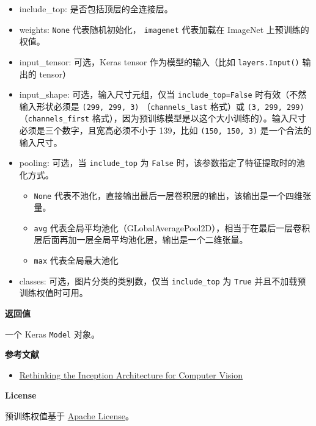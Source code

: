 \begin{itemize}
\tightlist
\item
  include\_top: 是否包括顶层的全连接层。
\item
  weights: \texttt{None} 代表随机初始化，
  \texttt{\textquotesingle{}imagenet\textquotesingle{}} 代表加载在
  ImageNet 上预训练的权值。
\item
  input\_tensor: 可选，Keras tensor 作为模型的输入（比如
  \texttt{layers.Input()} 输出的 tensor）
\item
  input\_shape: 可选，输入尺寸元组，仅当 \texttt{include\_top=False}
  时有效（不然输入形状必须是 \texttt{(299,\ 299,\ 3)}
  （\texttt{channels\_last} 格式）或 \texttt{(3,\ 299,\ 299)}
  （\texttt{channels\_first}
  格式），因为预训练模型是以这个大小训练的）。输入尺寸必须是三个数字，且宽高必须不小于
  139，比如 \texttt{(150,\ 150,\ 3)} 是一个合法的输入尺寸。
\item
  pooling: 可选，当 \texttt{include\_top} 为 \texttt{False}
  时，该参数指定了特征提取时的池化方式。

  \begin{itemize}
  \tightlist
  \item
    \texttt{None}
    代表不池化，直接输出最后一层卷积层的输出，该输出是一个四维张量。
  \item
    \texttt{\textquotesingle{}avg\textquotesingle{}}
    代表全局平均池化（GLobalAveragePool2D），相当于在最后一层卷积层后面再加一层全局平均池化层，输出是一个二维张量。
  \item
    \texttt{\textquotesingle{}max\textquotesingle{}} 代表全局最大池化
  \end{itemize}
\item
  classes: 可选，图片分类的类别数，仅当 \texttt{include\_top} 为
  \texttt{True} 并且不加载预训练权值时可用。
\end{itemize}

\textbf{返回值}\label{ux8fd4ux56deux503c-5}

一个 Keras \texttt{Model} 对象。

\textbf{参考文献}\label{ux53c2ux8003ux6587ux732e-5}

\begin{itemize}
\tightlist
\item
  \href{http://arxiv.org/abs/1512.00567}{Rethinking the Inception
  Architecture for Computer Vision}
\end{itemize}

\textbf{License}\label{license-5}

预训练权值基于
\href{https://github.com/tensorflow/models/blob/master/LICENSE}{Apache
License}。



